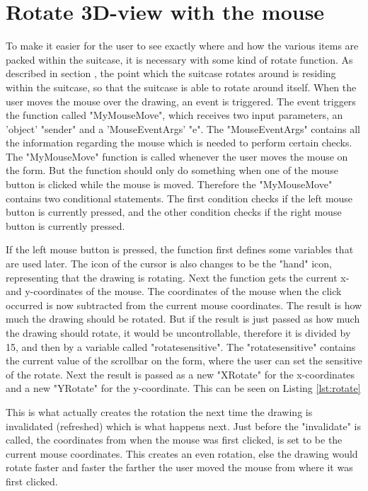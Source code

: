 \section{Rotate 3D-view with the mouse}

To make it easier for the user to see exactly where and how the various items are packed within the suitcase, it is necessary with some kind of rotate function. As described in section , the point which the suitcase rotates around is residing within the suitcase, so that the suitcase is able to rotate around itself. When the user moves the mouse over the drawing, an event is triggered. The event triggers the function called "MyMouseMove", which receives two input parameters, an 'object' "sender" and a 'MouseEventArgs' "e". The "MouseEventArgs" contains all the information regarding the mouse which is needed to perform certain checks. The "MyMouseMove" function is called whenever the user moves the mouse on the form. But the function should only do something when one of the mouse button is clicked while the mouse is moved. Therefore the "MyMouseMove" contains two conditional statements. The first condition checks if the left mouse button is currently pressed, and the other condition checks if the right mouse button is currently pressed.

If the left mouse button is pressed, the function first defines some variables that are used later. The icon of the cursor is also changes to be the "hand" icon, representing that the drawing is rotating. Next the function gets the current x- and y-coordinates of the mouse. The coordinates of the mouse when the click occurred is now subtracted from the current mouse coordinates. The result is how much the drawing should be rotated. But if the result is just passed as how much the drawing should rotate, it would be uncontrollable, therefore it is divided by 15, and then by a variable called "rotatesensitive". The "rotatesensitive" contains the current value of the scrollbar on the form, where the user can set the sensitive of the rotate. Next the result is passed as a new "XRotate" for the x-coordinates and a new "YRotate" for the y-coordinate. This can be seen on Listing \ref{lst:rotate}


This is what actually creates the rotation the next time the drawing is invalidated (refreshed) which is what happens next. Just before the "invalidate" is called, the coordinates from when the mouse was first clicked, is set to be the current mouse coordinates. This creates an even rotation, else the drawing would rotate faster and faster the farther the user moved the mouse from where it was first clicked. 